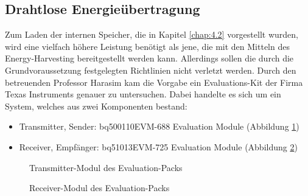 \documentclass[12pt]{scrreprt} %
\begin{document}
\subsection{Drahtlose Energieübertragung}
\label{chap:4.1.2}
Zum Laden der internen Speicher, die in Kapitel \vref{chap:4.2} vorgestellt wurden, wird eine vielfach höhere Leistung benötigt als jene, die mit den Mitteln des Energy-Harvesting bereitgestellt werden kann. Allerdings sollen die durch die Grundvoraussetzung festgelegten Richtlinien nicht verletzt werden. Durch den betreuenden Professor Harasim kam die Vorgabe ein Evaluations-Kit der Firma Texas Instruments genauer zu untersuchen. Dabei handelte es sich um ein System, welches aus zwei Komponenten bestand:
\begin{itemize}
\item
Transmitter, Sender: bq500110EVM-688 Evaluation Module (Abbildung \ref{BQ_transm})
\item
Receiver, Empfänger: bq51013EVM-725 Evaluation Module (Abbildung \ref{BQ_rec})
\end{itemize}
\begin{figure}
\centering
{}
\caption{Transmitter-Modul des Evaluation-Packs}
\label{BQ_transm}
\end{figure}
\begin{figure}
\centering
{}
\caption{Receiver-Modul des Evaluation-Packs}
\label{BQ_rec}
\end{figure}
\end{document}
